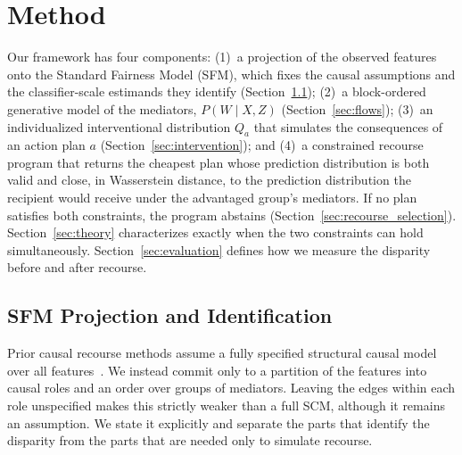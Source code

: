 \section{Method}
\label{sec:method}

Our framework has four components:
(1)~a projection of the observed features onto the Standard Fairness Model
(SFM), which fixes the causal assumptions and the classifier-scale estimands
they identify (Section~\ref{sec:projection});
(2)~a block-ordered generative model of the mediators, $P(W\mid X,Z)$
(Section~\ref{sec:flows});
(3)~an individualized interventional distribution $Q_a$ that simulates the
consequences of an action plan $a$ (Section~\ref{sec:intervention}); and
(4)~a constrained recourse program that returns the cheapest plan whose
prediction distribution is both valid and close, in Wasserstein distance, to
the prediction distribution the recipient would receive under the advantaged
group's mediators. If no plan satisfies both constraints, the program
abstains (Section~\ref{sec:recourse_selection}).
Section~\ref{sec:theory} characterizes exactly when the two constraints can
hold simultaneously. Section~\ref{sec:evaluation} defines how we measure the
disparity before and after recourse.

\subsection{SFM Projection and Identification}
\label{sec:projection}

Prior causal recourse methods assume a fully specified structural causal model
over all features~\citep{karimi2021algorithmic}. We instead commit only to a
partition of the features into causal roles and an order over groups of
mediators. Leaving the edges within each role unspecified makes this strictly
weaker than a full SCM, although it remains an assumption. We state it
explicitly and separate the parts that identify the disparity from the parts
that are needed only to simulate recourse.

